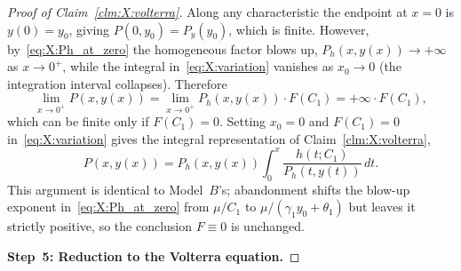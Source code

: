 \begin{proof}[Proof of Claim~\ref{clm:X:volterra}]
Along any characteristic the endpoint at $x=0$ is $y(0)=y_0$, giving
$P(0,y_0)=P_y(y_0)$, which is finite. However, by~\eqref{eq:X:Ph_at_zero} the homogeneous
factor blows up, $P_h(x,y(x))\to+\infty$ as $x\to0^+$, while the integral
in~\eqref{eq:X:variation} vanishes as $x_0\to0$ (the integration interval collapses).
Therefore
\[
    \lim_{x\to0^+}P(x,y(x))
    = \lim_{x\to0^+}P_h(x,y(x))\cdot F(C_1)
    = +\infty\cdot F(C_1),
\]
which can be finite only if $F(C_1)=0$. Setting $x_0=0$ and $F(C_1)=0$
in~\eqref{eq:X:variation} gives the integral representation of
Claim~\ref{clm:X:volterra},
\begin{equation}
    P(x,y(x)) = P_h(x,y(x))\int_{0}^{x} \frac{h(t;C_1)}{P_h(t,y(t))}\,dt.
    \label{eq:X:integral_rep_body}
\end{equation}
This argument is identical to Model~$B$'s; abandonment shifts the blow-up exponent
in~\eqref{eq:X:Ph_at_zero} from $\mu/C_1$ to $\mu/(\gamma_1 y_0+\theta_1)$ but leaves it
strictly positive, so the conclusion $F\equiv0$ is unchanged.

\medskip\noindent\textbf{Step~5: Reduction to the Volterra equation.}


\end{proof}
